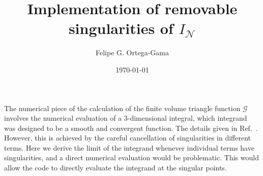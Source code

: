 \documentclass[aps,prd,onecolumn,groupedaddress]{revtex4-2}
\begin{document}
\title{Implementation of removable singularities of \texorpdfstring{$I_\mathcal{N}$}{IN}}


\author{Felipe G. Ortega-Gama}


\date{\today}



\maketitle


The numerical piece of the calculation of the finite volume triangle function $\mathcal{G}$ involves the numerical evaluation of a 3-dimensional integral, which integrand was designed to be a smooth and convergent function.
The details given in Ref.~\cite{Baroni:2018iau}.
However, this is achieved by the careful cancellation of singularities in different terms.
Here we derive the limit of the integrand whenever individual terms have singularities, and a direct numerical evaluation  would be problematic.
This would allow the code to directly evaluate the integrand at the singular points.
\end{document}
